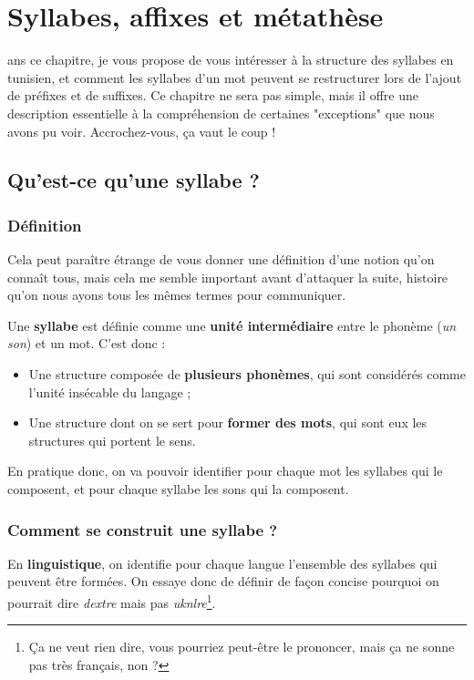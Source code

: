 \chapter{Syllabes, affixes et métathèse}
ans ce chapitre, je vous propose de vous intéresser à la structure des syllabes en tunisien, et comment les syllabes d'un mot peuvent se restructurer lors de l'ajout de préfixes et de suffixes. Ce chapitre ne sera pas simple, mais il offre une description essentielle à la compréhension de certaines "exceptions" que nous avons pu voir. Accrochez-vous, ça vaut le coup !

\section{Qu'est-ce qu'une syllabe ?}
\subsection{Définition}
Cela peut paraître étrange de vous donner une définition d'une notion qu'on connaît tous, mais cela me semble important avant d'attaquer la suite, histoire qu'on nous ayons tous les mêmes termes pour communiquer. 

Une \textbf{syllabe} est définie comme une \textbf{unité intermédiaire} entre le phonème (\textit{un son}) et un mot. C'est donc : 
\begin{itemize}
    \item Une structure composée de \textbf{plusieurs phonèmes}, qui sont considérés comme l'unité insécable du langage ; 
    \item Une structure dont on se sert pour \textbf{former des mots}, qui sont eux les structures qui portent le sens.
\end{itemize}

En pratique donc, on va pouvoir identifier pour chaque mot les syllabes qui le composent, et pour chaque syllabe les sons qui la composent. 

\subsection{Comment se construit une syllabe ?}
En \textbf{linguistique}, on identifie pour chaque langue l'ensemble des syllabes qui peuvent être formées. On essaye donc de définir de façon concise pourquoi on pourrait dire \textit{dextre} mais pas \textit{uknlre}\footnote{Ça ne veut rien dire, vous pourriez peut-être le prononcer, mais ça ne sonne pas très français, non ?}.

